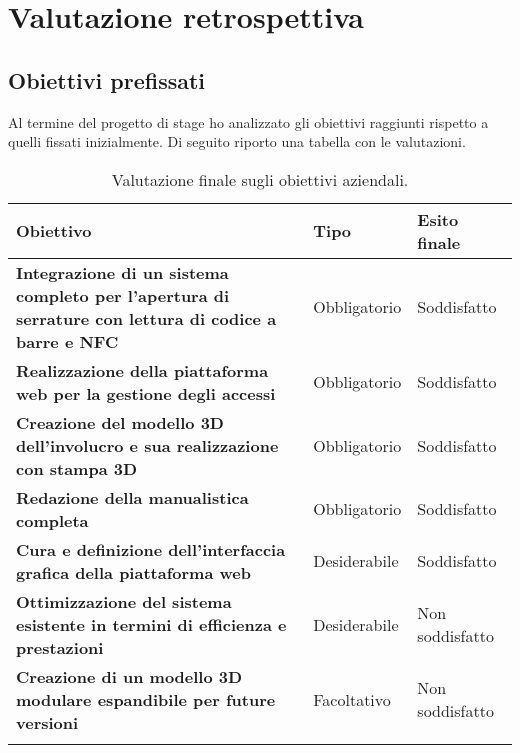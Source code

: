 
\chapter{Valutazione retrospettiva}
\label{cap:valutazione-retrospettiva}

\section{Obiettivi prefissati}
Al termine del progetto di stage ho analizzato gli obiettivi raggiunti rispetto a quelli fissati inizialmente. Di seguito riporto una tabella con le valutazioni.

\renewcommand{\arraystretch}{1.4}
\begin{longtable}{|p{7cm}|p{2.5cm}|p{3cm}|}
\hline
\textbf{Obiettivo} & \textbf{Tipo} & \textbf{Esito finale} \\ 
\hline
\textbf{Integrazione di un sistema completo per l'apertura di serrature con lettura di codice a barre e NFC} & Obbligatorio & Soddisfatto \\ 
\hline
\textbf{Realizzazione della piattaforma web per la gestione degli accessi} & Obbligatorio & Soddisfatto \\ 
\hline
\textbf{Creazione del modello 3D dell'involucro e sua realizzazione con stampa 3D} & Obbligatorio & Soddisfatto \\ 
\hline
\textbf{Redazione della manualistica completa} & Obbligatorio & Soddisfatto \\ 
\hline
\textbf{Cura e definizione dell'interfaccia grafica della piattaforma web} & Desiderabile & Soddisfatto \\ 
\hline
\textbf{Ottimizzazione del sistema esistente in termini di efficienza e prestazioni} & Desiderabile & Non soddisfatto \\ 
\hline
\textbf{Creazione di un modello 3D modulare espandibile per future versioni} & Facoltativo & Non soddisfatto \\ 
\hline
\caption{Valutazione finale sugli obiettivi aziendali.}
\end{longtable}

